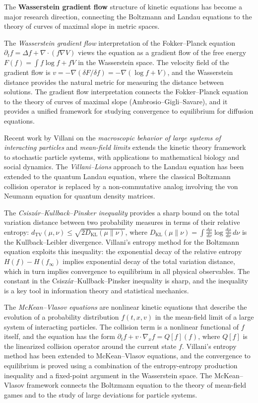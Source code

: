 The \textbf{Wasserstein gradient flow} structure of kinetic equations has become a major research direction, connecting the Boltzmann and Landau equations to the theory of curves of maximal slope in metric spaces.

The \emph{Wasserstein gradient flow} interpretation of the Fokker--Planck equation $\partial_t f = \Delta f + \nabla \cdot (f \nabla V)$ views the equation as a gradient flow of the free energy $F(f) = \int f \log f + f V$ in the Wasserstein space. The velocity field of the gradient flow is $v = -\nabla(\delta F / \delta f) = -\nabla(\log f + V)$, and the Wasserstein distance provides the natural metric for measuring the distance between solutions. The gradient flow interpretation connects the Fokker--Planck equation to the theory of curves of maximal slope (Ambrosio--Gigli--Savare), and it provides a unified framework for studying convergence to equilibrium for diffusion equations.

Recent work by Villani on the \emph{macroscopic behavior of large systems of interacting particles} and \emph{mean-field limits} extends the kinetic theory framework to stochastic particle systems, with applications to mathematical biology and social dynamics. The \emph{Villani--Lions} approach to the Landau equation has been extended to the quantum Landau equation, where the classical Boltzmann collision operator is replaced by a non-commutative analog involving the von Neumann equation for quantum density matrices.

The \emph{Csisz\'{a}r--Kullback--Pinsker inequality} provides a sharp bound on the total variation distance between two probability measures in terms of their relative entropy: $d_{\text{TV}}(\mu,\nu) \leq \sqrt{2 D_{\text{KL}}(\mu \| \nu)}$, where $D_{\text{KL}}(\mu \| \nu) = \int \frac{d\mu}{d\nu} \log \frac{d\mu}{d\nu} \, d\nu$ is the Kullback--Leibler divergence. Villani's entropy method for the Boltzmann equation exploits this inequality: the exponential decay of the relative entropy $H(f) - H(f_\infty)$ implies exponential decay of the total variation distance, which in turn implies convergence to equilibrium in all physical observables. The constant in the Csisz\'{a}r--Kullback--Pinsker inequality is sharp, and the inequality is a key tool in information theory and statistical mechanics.

The \emph{McKean--Vlasov equations} are nonlinear kinetic equations that describe the evolution of a probability distribution $f(t,x,v)$ in the mean-field limit of a large system of interacting particles. The collision term is a nonlinear functional of $f$ itself, and the equation has the form $\partial_t f + v \cdot \nabla_x f = Q[f](f)$, where $Q[f]$ is the linearized collision operator around the current state $f$. Villani's entropy method has been extended to McKean--Vlasov equations, and the convergence to equilibrium is proved using a combination of the entropy-entropy production inequality and a fixed-point argument in the Wasserstein space. The McKean--Vlasov framework connects the Boltzmann equation to the theory of mean-field games and to the study of large deviations for particle systems.

